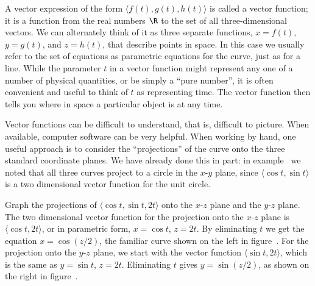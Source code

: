 A vector expression of the form $\langle f(t),g(t),h(t)\rangle$ is called
a {\dfont vector function}; it is a function from
the real numbers $\R$ to the set of all three-dimensional vectors.
We can alternately think of it as three separate functions, 
$x=f(t)$, $y=g(t)$, and $z=h(t)$, that describe points in space. In
this case we usually refer to the set of equations as {\dfont
parametric equations} for the curve, just
as for a line. While the parameter $t$ in a vector function might
represent any one of a number of physical quantities, or be simply a
``pure number'', it is often convenient and useful to think of $t$ as
representing time. The vector function then tells you where in space
a particular object is at any time.

Vector functions can be difficult to understand, that is, difficult to
picture. When available, computer software can be very helpful. When
working by hand, one useful approach is to consider the
``projections'' of the curve onto the three standard coordinate
planes. We have already done this in part: in
example~ we noted that all three curves project to
a circle in the $x$-$y$ plane, since $\langle \cos t,\sin t\rangle$ is
a two dimensional vector function for the unit circle.

\begin{example} Graph the projections of $\langle \cos t,\sin
t,2t\rangle$ onto the $x$-$z$ plane and the $y$-$z$ plane.
The two dimensional vector function for the
projection onto the $x$-$z$ plane is $\langle \cos t, 2t\rangle$, or in
parametric form, $x=\cos t$, $z=2t$. By eliminating $t$ we get the
equation $x=\cos(z/2)$, the familiar curve shown on the left in
figure~. For the projection onto the $y$-$z$ plane, we start
with the vector function $\langle \sin t, 2t\rangle$, which is the
same as $y=\sin t$, $z=2t$. Eliminating $t$ gives $y=\sin(z/2)$, as
shown on the right in figure~.
\end{example}


